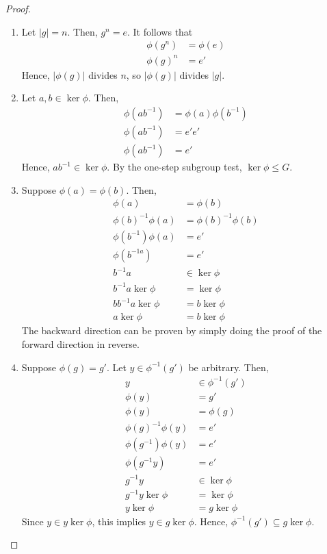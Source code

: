 \begin{proof}
\begin{enumerate}
            \item Let \(|g| = n\). Then, \(g^n = e\). It follows that
            \begin{align*}
                \phi(g^n) &= \phi(e) \\
                \phi(g)^n &= e'
            \end{align*}
            Hence, \(|\phi(g)|\) divides \(n\), so \(|\phi(g)|\) divides \(|g|\).

            \item Let \(a,b\in \ker\phi\). Then,
            \begin{align*}
                \phi(ab^{-1}) &= \phi(a)\phi(b^{-1}) \\
                \phi(ab^{-1}) &= e'e' \\
                \phi(ab^{-1}) &= e'
            \end{align*}
            Hence, \(ab^{-1}\in\ker\phi\). By the one-step subgroup test, \(\ker\phi \leq G\).

            \item Suppose \(\phi(a) = \phi(b)\). Then,
            \begin{align*}
                \phi(a) &= \phi(b) \\
                \phi(b)^{-1}\phi(a) &= \phi(b)^{-1}\phi(b) \\
                \phi(b^{-1})\phi(a) &= e' \\
                \phi(b^{-1a}) &= e' \\
                b^{-1}a &\in \ker\phi \\
                b^{-1}a \ker\phi &= \ker\phi \\
                bb^{-1}a \ker\phi &= b\ker\phi \\
                a \ker\phi &= b\ker\phi
            \end{align*}
            The backward direction can be proven by simply doing the proof of the forward direction in reverse.

            \item Suppose \(\phi(g) = g'\). Let \(y\in \phi^{-1}(g')\) be arbitrary. Then,
            \begin{align*}
                y &\in \phi^{-1}(g') \\
                \phi(y) &= g' \\
                \phi(y) &= \phi(g) \\
                \phi(g)^{-1}\phi(y) &= e' \\
                \phi(g^{-1})\phi(y) &= e' \\
                \phi(g^{-1}y) &= e' \\
                g^{-1}y &\in \ker\phi \\
                g^{-1}y \ker\phi &= \ker\phi \\
                y \ker\phi &= g\ker\phi
            \end{align*}
            Since \(y\in y\ker\phi\), this implies \(y\in g\ker\phi\). Hence, \(\phi^{-1}(g') \subseteq g\ker\phi\).


\end{enumerate}
\end{proof}
